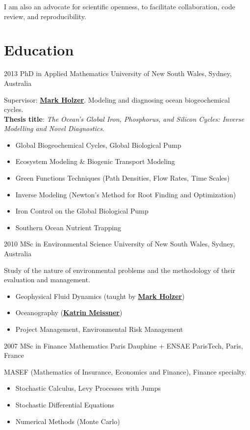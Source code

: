 \documentclass[12pt]{friggeri-cv}
\begin{document}
I am also an advocate for scientific openness, to facilitate collaboration, code review, and reproducibility.







\newpage
\section{Education}
\begin{entrylist}
  \entry
    {2013}
    {PhD in Applied Mathematics}
    {University of New South Wales, Sydney, Australia}
    {Supervisor: \hyperref[MH]{\textbf{Mark Holzer}}.
    Modeling and diagnosing ocean biogeochemical cycles.\\
    \textbf{Thesis title}: \emph{The Ocean's Global Iron, Phosphorus, and Silicon Cycles: Inverse Modelling and Novel Diagnostics}.
    \begin{itemize}
        \item Global Biogeochemical Cycles, Global Biological Pump
        \item Ecosystem Modeling \& Biogenic Transport Modeling
        \item Green Functions Techniques (Path Densities, Flow Rates, Time Scales)
        \item Inverse Modeling (Newton's Method for Root Finding and Optimization)
        \item Iron Control on the Global Biological Pump
        \item Southern Ocean Nutrient Trapping
    \end{itemize}
    }

  \entry
    {2010}
    {MSc in Environmental Science}
    {University of New South Wales, Sydney, Australia}
    {Study of the nature of environmental problems and the methodology of their evaluation and management.
    \begin{itemize}
      \item Geophysical Fluid Dynamics (taught by \hyperref[MH]{\textbf{Mark Holzer}})
      \item Oceanography (\hyperref[KM]{\textbf{Katrin Meissner}})
      \item Project Management, Environmental Risk Management
    \end{itemize}
    }

  \entry
    {2007}
    {MSc in Finance Mathematics}
    {Paris Dauphine + ENSAE ParisTech, Paris, France}
    {MASEF (Mathematics of Insurance, Economics and Finance), Finance specialty.
    \begin{itemize}
        \item Stochastic Calculus, Levy Processes with Jumps
        \item Stochastic Differential Equations
        \item Numerical Methods (Monte Carlo)
    \end{itemize}
    }


\end{entrylist}
\end{document}
